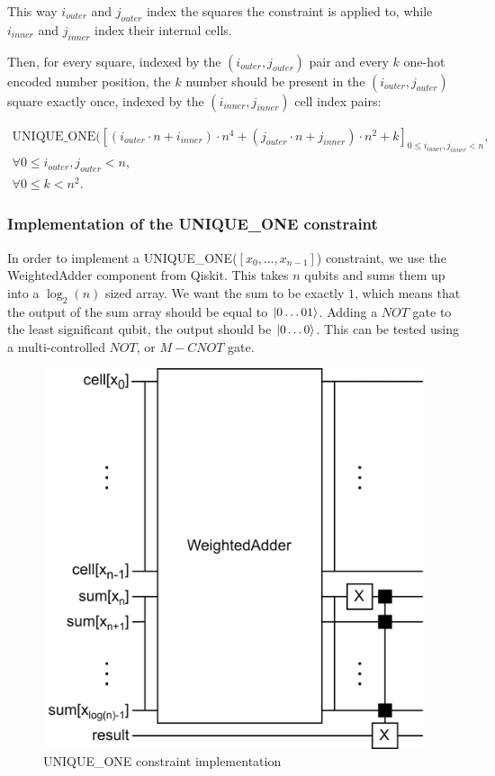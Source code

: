 This way $i_{outer}$ and $j_{outer}$ index the squares the constraint is applied to, while $i_{inner}$ and $j_{inner}$ index their internal cells.

Then, for every square, indexed by the $(i_{outer}, j_{outer})$ pair and every $k$ one-hot encoded number position, the $k$ number should be present in the $(i_{outer}, j_{outer})$ square exactly once, indexed by the $(i_{inner}, j_{inner})$ cell index pairs:

\begin{align*}
    \text{UNIQUE\_ONE}([(i_{outer}\cdot{}n + i_{inner})\cdot{}n^4 + (j_{outer}\cdot{}n + j_{inner})\cdot{}n^2 + k]_{0\leq{}i_{inner},j_{inner}<n},\\
\forall{}0\leq{}i_{outer},j_{outer}<n,\\
\forall{}0\leq{}k<n^2.
\end{align*}

\subsubsection{Implementation of the UNIQUE\_ONE constraint}

In order to implement a UNIQUE\_ONE($[x_0,\dots,{}x_{n-1}]$) constraint, we use the WeightedAdder component from Qiskit. This takes $n$ qubits and sums them up into a $\log_{2}(n)$ sized array. We want the sum to be exactly $1$, which means that the output of the sum array should be equal to $\ket{0\dots{}01}$. Adding a $NOT$ gate to the least significant qubit, the output should be $\ket{0\dots{}0}$. This can be tested using a multi-controlled $NOT$, or $M-CNOT$ gate.

\begin{figure}[H]
  \centering
    \includegraphics[width=0.7\linewidth]{content/assets/03_grovers_algorithm/unique_one.png}
    \caption{UNIQUE\_ONE constraint implementation}
\end{figure}

